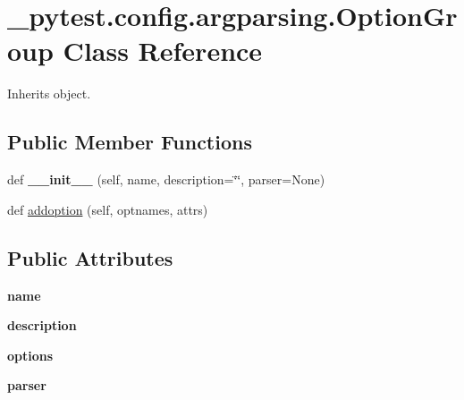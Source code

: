 \hypertarget{class__pytest_1_1config_1_1argparsing_1_1_option_group}{}\section{\+\_\+pytest.\+config.\+argparsing.\+Option\+Group Class Reference}
\label{class__pytest_1_1config_1_1argparsing_1_1_option_group}


Inherits object.

\subsection*{Public Member Functions}
\begin{DoxyCompactItemize}
\item 
\mbox{\label{class__pytest_1_1config_1_1argparsing_1_1_option_group_a03a3262dbbfb20e035d194b495c23439}} 
def {\bfseries \+\_\+\+\_\+init\+\_\+\+\_\+} (self, name, description=\char`\"{}\char`\"{}, parser=None)
\item 
def \hyperlink{class__pytest_1_1config_1_1argparsing_1_1_option_group_a4fc637e3a67d3ab6209499ad98b005a1}{addoption} (self, optnames, attrs)
\end{DoxyCompactItemize}
\subsection*{Public Attributes}
\begin{DoxyCompactItemize}
\item 
\mbox{\label{class__pytest_1_1config_1_1argparsing_1_1_option_group_af1aee1968e3ab60194d6e643302455cb}} 
{\bfseries name}
\item 
\mbox{\label{class__pytest_1_1config_1_1argparsing_1_1_option_group_a257291944ae498cd096a8aee08d6f865}} 
{\bfseries description}
\item 
\mbox{\label{class__pytest_1_1config_1_1argparsing_1_1_option_group_a10eac337d8e10059f2d9ca6f86fe5273}} 
{\bfseries options}
\item 
\mbox{\label{class__pytest_1_1config_1_1argparsing_1_1_option_group_a526a64d57bb2fcfde7baed52ee88cc45}} 
{\bfseries parser}
\end{DoxyCompactItemize}


